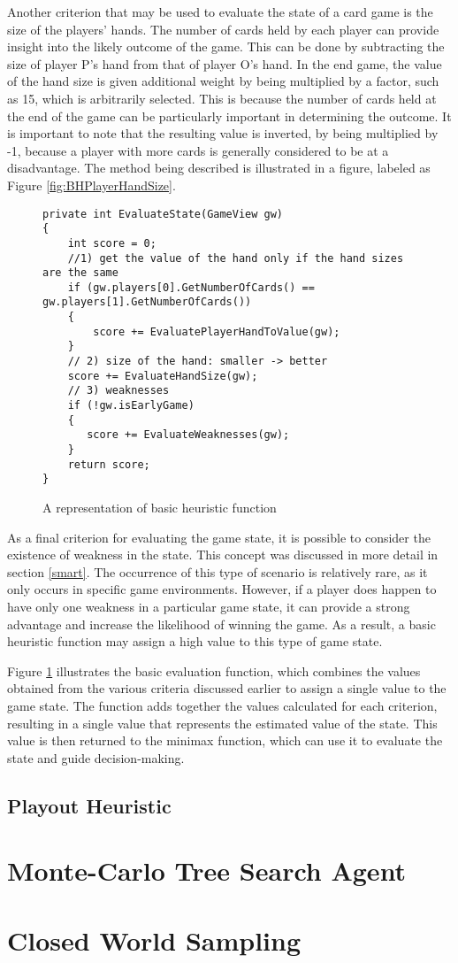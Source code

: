 Another criterion that may be used to evaluate the state of a card game is the size of the players' hands. The number of cards held by each player can provide insight into the likely outcome of the game. This can be done by subtracting the size of player P's hand from that of player O's hand. In the end game, the value of the hand size is given additional weight by being multiplied by a factor, such as 15, which is arbitrarily selected. This is because the number of cards held at the end of the game can be particularly important in determining the outcome. It is important to note that the resulting value is inverted, by being multiplied by -1, because a player with more cards is generally considered to be at a disadvantage. The method being described is illustrated in a figure, labeled as Figure \ref{fig:BHPlayerHandSize}.

\begin{figure}[h]
\captionsetup{justification=centering}
\begin{lstlisting}[frame=single]
private int EvaluateState(GameView gw)
{
    int score = 0;
    //1) get the value of the hand only if the hand sizes are the same
    if (gw.players[0].GetNumberOfCards() == gw.players[1].GetNumberOfCards())
    {
        score += EvaluatePlayerHandToValue(gw);
    }
    // 2) size of the hand: smaller -> better 
    score += EvaluateHandSize(gw);
    // 3) weaknesses 
    if (!gw.isEarlyGame)
    {
       score += EvaluateWeaknesses(gw);
    }
    return score;
}
\end{lstlisting}
\caption{A representation of basic heuristic function}
\label{fig:basicEval}
\end{figure}

As a final criterion for evaluating the game state, it is possible to consider the existence of weakness in the state. This concept was discussed in more detail in section \ref{smart}. The occurrence of this type of scenario is relatively rare, as it only occurs in specific game environments. However, if a player does happen to have only one weakness in a particular game state, it can provide a strong advantage and increase the likelihood of winning the game. As a result, a basic heuristic function may assign a high value to this type of game state.

Figure \ref{fig:basicEval} illustrates the basic evaluation function, which combines the values obtained from the various criteria discussed earlier to assign a single value to the game state. The function adds together the values calculated for each criterion, resulting in a single value that represents the estimated value of the state. This value is then returned to the minimax function, which can use it to evaluate the state and guide decision-making.

\subsection{Playout Heuristic}



\section{Monte-Carlo Tree Search Agent}
\label{MCTS}

\section{Closed World Sampling}